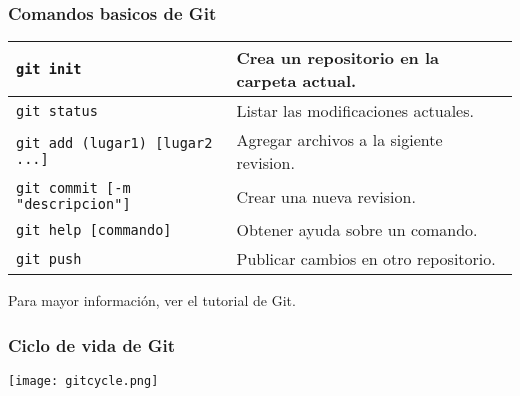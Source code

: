 \documentclass{beamer}
\begin{document}
\begin{frame}

\frametitle{Comandos basicos de Git}

\begin{tabular}{|l|p{5cm}|}

    \hline

    \texttt{git init} & {Crea un repositorio en la carpeta actual.} \\

    \hline

    \texttt{git status} & Listar las modificaciones actuales. \\

    \hline

    \texttt{git add (lugar1) [lugar2 ...]} & Agregar archivos a la sigiente revision. \\

    \hline

    \texttt{git commit [-m "descripcion"]} & Crear una nueva revision. \\

    \hline

    \texttt{git help [commando]} & Obtener ayuda sobre un comando. \\

    \hline

    \texttt{git push} & Publicar cambios en otro repositorio. \\

    \hline

\end{tabular}

\newline\newline

Para mayor informaci\'on, ver el tutorial de Git\cite{GitTutorial}.

\end{frame}



\begin{frame}

\frametitle{Ciclo de vida de Git}

\begin{center}

\texttt{[image: gitcycle.png]}

\end{center}

\end{frame}
\end{document}
